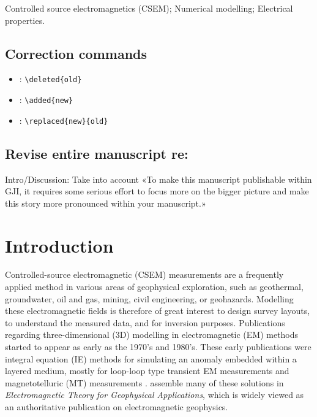 \documentclass[extra, camera,%
]{gji}
\newcommand{\ymark}[1]{%
  \begin{tcolorbox}[colback=yellow!40!white]#1\end{tcolorbox}}
\begin{document}
\begin{keywords}
  Controlled source electromagnetics (CSEM); Numerical modelling; Electrical properties.
\end{keywords}

\clearpage

\subsection*{Correction commands}
\begin{itemize}
  \item {}: \texttt{\textbackslash deleted\{old\}}
  \item {}: \texttt{\textbackslash added\{new\}}
  \item {}: \texttt{\textbackslash replaced\{new\}\{old\}}
\end{itemize}

\subsection*{Revise entire manuscript re:}
\ymark{Intro/Discussion: Take into account «To make this manuscript publishable within GJI, it requires some serious effort to focus more on the bigger picture and make this story more pronounced within your manuscript.»}

\listoftodos

\clearpage

\section{Introduction}

Controlled-source electromagnetic (CSEM) measurements are a frequently applied method in various areas of geophysical exploration, such as geothermal, groundwater, oil and gas, mining, civil engineering, or geohazards. Modelling these electromagnetic fields is therefore of great interest to design survey layouts, to understand the measured data, and for inversion purposes. Publications regarding three-dimensional (3D) modelling in electromagnetic (EM) methods started to appear as early as the 1970's and 1980's. These early publications were integral equation (IE) methods for simulating an anomaly embedded within a layered medium, mostly for loop-loop type transient EM measurements  \citep{GJI.74.Raiche, GEO.75.Hohmann, GJI.82.Das, GEO.86.Newman} and magnetotelluric (MT) measurements \citep{GEO.84.Wannamaker}. \cite{B.SEG.88.Ward} assemble many of these solutions in \emph{Electromagnetic Theory for Geophysical Applications}, which is widely viewed as an authoritative publication on electromagnetic geophysics.
\end{document}

